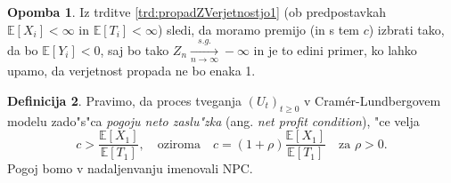 \documentclass[12pt, a4paper, reqno]{amsart}
\theoremstyle{definition}
\newtheorem{definicija}{Definicija}[section]
\newtheorem{opomba}[definicija]{Opomba}
\theoremstyle{plain}
\newcommand{\N}{\mathbb{N}}
\newcommand{\E}{\mathbb{E}}
\newcommand{\Prob}{\mathbb{P}}
\newcommand{\1}{\mathds{1}}
\begin{document}
        \begin{opomba}
            Iz trditve \ref{trd:propadZVerjetnostjo1} (ob predpostavkah $\E\left[X_i\right] < \infty$
            in $\E\left[T_i\right] < \infty$) sledi, da moramo premijo (in s tem $c$) izbrati tako, da bo 
            $\E\left[Y_i\right] < 0$, saj bo tako $Z_{n} \xrightarrow[n\to\infty]{s.g.}-\infty$
            in je to edini primer, ko lahko upamo, da verjetnost propada ne bo
            enaka 1.
            \label{op:izbiraPremije}
        \end{opomba}
    
%
%
%

        \begin{definicija}
            Pravimo, da proces tveganja $(U_t)_{t\geq0}$ v Cramér-Lundbergovem modelu
             zado"s"ca \textit{pogoju neto zaslu"zka} (ang. \textit{net profit condition}), "ce velja 
            \begin{equation*}
                c > \frac{\E\left[X_1\right]}{\E\left[T_1\right]}, \quad \text{oziroma} \quad 
                c = (1 + \rho)\frac{\E\left[X_1\right]}{\E\left[T_1\right]} \quad \text{za $\rho > 0$}.
            \end{equation*}
            Pogoj bomo v nadaljenvanju imenovali NPC.
            \label{def:NPC}
        \end{definicija}
\end{document}

